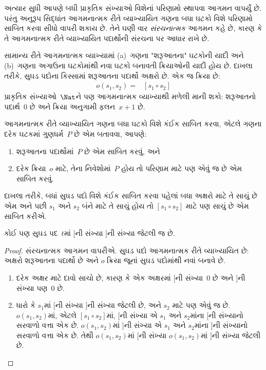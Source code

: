 \begingroup
\makeatletter{}\makeatother


\label{guunit:OLP-0618}


અત્યાર સુધી આપણે બધી પ્રાકૃતિક સંખ્યાઓ વિશેનાં
પરિણામો સ્થાપવા આગમન વાપર્યું છે. પરંતુ અનુરૂપ
સિદ્ધાંત આગમનાત્મક રીતે વ્યાખ્યાયિત ગણના બધા
ઘટકો વિશે પરિણામો સાબિત કરવા સીધો વાપરી
શકાય છે. તેને ઘણી વાર \emph{સંરચનાત્મક} આગમન
કહે છે, કારણ કે તે આગમનાત્મક રીતે વ્યાખ્યાયિત
પદાર્થોની સંરચના પર આધાર રાખે છે.

સામાન્ય રીતે આગમનાત્મક વ્યાખ્યામાં (a)~ગણના
"શરૂઆતના" ઘટકોની યાદી અને (b)~ગણના
અગાઉના ઘટકોમાંથી નવા ઘટકો
બનાવતી ક્રિયાઓની યાદી હોય છે. દાખલા તરીકે,
સુઘડ પદોના કિસ્સામાં શરૂઆતના પદાર્થો અક્ષરો છે.
એક જ ક્રિયા છે:
\begin{align*}
  o(s_1, s_2) = & [s_1 \circ s_2]
\end{align*}
પ્રાકૃતિક સંખ્યાઓ~$\Nat$ને પણ આગમનાત્મક
વ્યાખ્યાથી મળેલી માની શકો: શરૂઆતનો પદાર્થ~$0$
છે અને ક્રિયા અનુગામી ફલન~$x + 1$ છે.

આગમનાત્મક રીતે વ્યાખ્યાયિત ગણના બધા ઘટકો
વિશે કંઈક સાબિત કરવા, એટલે ગણના દરેક
ઘટકમાં ગુણધર્મ~$P$ છે એમ બતાવવા,
આપણે:
\begin{enumerate}
\item શરૂઆતના પદાર્થોમાં~$P$ છે એમ સાબિત કરવું, અને
\item દરેક ક્રિયા~$o$ માટે, તેના નિવેશોમાં~$P$
  હોય તો પરિણામ માટે પણ એવું જ છે એમ સાબિત કરવું.
\end{enumerate}
દાખલા તરીકે, બધાં સુઘડ પદો વિશે કંઈક સાબિત
કરવા પહેલાં બધા અક્ષરો માટે તે સાચું છે એમ
અને પછી $s_1$ અને $s_2$ બંને માટે તે સાચું
હોય તો $[s_1 \circ s_2]$ માટે પણ સાચું છે
એમ સાબિત કરીએ.

\begin{prop}
  કોઈ પણ સુઘડ પદ~$t$માં $[$ની સંખ્યા $]$ની
  સંખ્યા જેટલી જ છે.
\end{prop}

\begin{proof}
સંરચનાત્મક આગમન વાપરીએ. સુઘડ પદો આગમનાત્મક
રીતે વ્યાખ્યાયિત છે: અક્ષરો શરૂઆતના પદાર્થો છે
અને $o$ ક્રિયા જૂનાં સુઘડ પદોમાંથી નવાં બનાવે છે.
\begin{enumerate}
\item દરેક અક્ષર માટે દાવો સાચો છે, કારણ કે એક
  અક્ષરમાં $[$ની સંખ્યા~$0$ છે અને $]$ની
  સંખ્યા પણ~$0$ છે.
\item ધારો કે $s_1$માં $[$ની સંખ્યા $]$ની
  સંખ્યા જેટલી છે, અને $s_2$ માટે પણ એવું
  જ છે. $o(s_1, s_2)$માં, એટલે
  $[s_1 \circ s_2]$માં, $[$ની સંખ્યા એ
  $s_1$ અને $s_2$માંના $[$ની સંખ્યાનો
  સરવાળો વત્તા એક છે. $o(s_1, s_2)$માં
  $]$ની સંખ્યા એ $s_1$ અને $s_2$માંના
  $]$ની સંખ્યાનો સરવાળો વત્તા એક છે.
  તેથી $o(s_1, s_2)$માં $[$ની સંખ્યા
  $o(s_1,s_2)$માં $]$ની સંખ્યા જેટલી છે.
\end{enumerate}
\end{proof}

